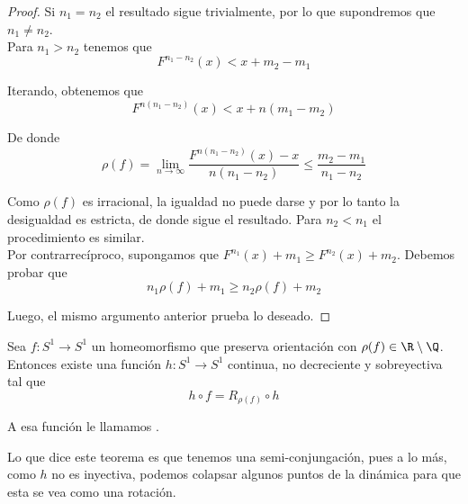 \documentclass[	docname= Sistemas\ Din\'amicos,
				finished=1,
				semester=1,
				year=2017,
				professor=Godofredo\ Iommi,
				sigla=MAT2565]{apunte}
\begin{document}
\begin{proof} Si $n_{1} = n_{2}$ el resultado sigue trivialmente, por lo que supondremos que $n_{1}\neq n_{2}$.	\\

\iffdem{\Longrightarrow}
Para $n_{1} > n_{2}$ tenemos que
	$$F^{n_{1} - n_{2}}(x) < x + m_{2} - m_{1}$$

Iterando, obtenemos que
	$$F^{n(n_{1} - n_{2})}(x) < x + n(m_{1} - m_{2})$$

De donde
	$$\rho(f) = \lim_{n \to \infty} \frac{F^{n(n_{1}- n_{2})}(x) - x}{n(n_{1} - n_{2})} \leq \frac{m_{2} - m_{1}}{n_{1} - n_{2}}$$

Como $\rho(f)$ es irracional, la igualdad no puede darse y por lo tanto la desigualdad es estricta, de donde sigue el resultado. Para $n_{2} < n_{1}$ el procedimiento es similar.	\\

\iffdem{\Longleftarrow}
Por contrarrecíproco, supongamos que $F^{n_{1}}(x) + m_{1} \geq F^{n_{2}}(x) + m_{2}$. Debemos probar que
	$$n_{1}\rho(f) + m_{1} \geq n_{2}\rho(f) + m_{2}$$

Luego, el mismo argumento anterior prueba lo deseado.
\end{proof}

\begin{teo} Sea $f: S^{1} \to S^{1}$ un homeomorfismo que preserva orientación con $\rho(f) \in \R \setminus \Q$. Entonces existe una función $h : S^{1} \to S^{1}$ continua, no decreciente y sobreyectiva tal que
	$$h \circ f = R_{\rho(f)} \circ h$$

A  esa función le llamamos .
\end{teo}

\begin{obst} Lo que dice este teorema es que tenemos una semi-conjungación, pues a lo más, como $h$ no es inyectiva, podemos colapsar algunos puntos de la dinámica para que esta se vea como una rotación.
\end{obst}
\end{document}
